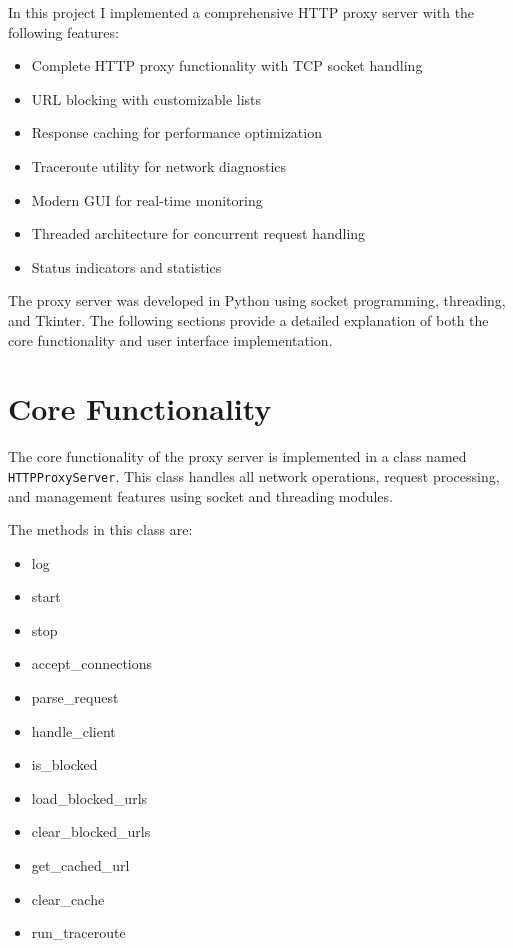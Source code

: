 \documentclass[a4paper]{article}
\begin{document}
	In this project I implemented a comprehensive HTTP proxy server with the following features:
	
	\begin{itemize}
		\item Complete HTTP proxy functionality with TCP socket handling
		\item URL blocking with customizable lists
		\item Response caching for performance optimization
		\item Traceroute utility for network diagnostics
		\item Modern GUI for real-time monitoring
		\item Threaded architecture for concurrent request handling
		\item Status indicators and statistics
	\end{itemize}
	
	The proxy server was developed in Python using socket programming, threading, and Tkinter. The following sections provide a detailed explanation of both the core functionality and user interface implementation.
	
	\section{Core Functionality}
	\label{sec:core}
	
	The core functionality of the proxy server is implemented in a class named \texttt{HTTPProxyServer}. This class handles all network operations, request processing, and management features using socket and threading modules.
	
	The methods in this class are:
	\begin{itemize}
		\item log
		\item start
		\item stop
		\item accept\_connections
		\item parse\_request
		\item handle\_client
		\item is\_blocked
		\item load\_blocked\_urls
		\item clear\_blocked\_urls
		\item get\_cached\_url
		\item clear\_cache
		\item run\_traceroute
	\end{itemize}
	
\end{document}
